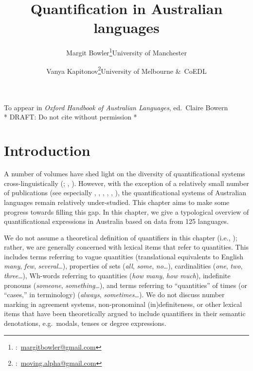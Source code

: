 \documentclass[12pt,egregdoesnotlikesansseriftitles]{scrartcl}
\title{Quantification in Australian languages}
\author{Margit Bowler\thanks{\Letter:~\href{mailto:margitbowler@gmail.com}{margitbowler@gmail.com}}\authorcr University of Manchester \and \vspace{-.5cm}Vanya Kapitonov\thanks{\Letter:~\href{mailto:moving.alpha@gmail.com}{moving.alpha@gmail.com}}\authorcr University of Melbourne \&\ CoEDL}
\begin{document}
\maketitle

\begin{center}
To appear in \textit{Oxford Handbook of Australian Languages}, ed.\ Claire Bowern\\
* DRAFT: Do not cite without permission *
\end{center}

\section{Introduction}

A number of volumes have shed light on the diversity of quantificational systems cross-linguistically (\citealt{keenanpaperno17,keenanpaperno12};  \citealt{qclp08}, \citealt{bachetal95}). However, with the exception of a relatively small number of publications (see especially \citealt{bowler17}, \citealt{bowernzentz12}, \citealt{alpher01},  \citealt{bittnerhale95}, \citealt{evans95}, \citealt{laughren81}), the quantificational systems of Australian languages remain relatively under-studied. This chapter aims to make some progress towards filling this gap. In this chapter, we give a typological overview of quantificational expressions in Australia based on data from 125 languages.

We do not assume a theoretical definition of quantifiers in this chapter (i.e., \citealt{heimkratzer98}); rather, we are generally concerned with lexical items that refer to quantities. This includes terms referring to vague quantities (translational equivalents to English \textit{many}, \textit{few}, \textit{several}\ldots), properties of sets (\textit{all}, \textit{some}, \textit{no}\ldots), cardinalities (\textit{one}, \textit{two}, \textit{three}\ldots), Wh-words referring to quantities (\textit{how many}, \textit{how much}), indefinite pronouns (\textit{someone}, \textit{something}\ldots), and terms referring to ``quantities'' of times (or ``cases,'' in  terminology) (\textit{always}, \textit{sometimes}\ldots). We do not discuss number marking in agreement systems, non-pronominal (in)definiteness, or other lexical items that have been theoretically argued to include quantifiers in their semantic denotations, e.g.\ modals, tenses or degree expressions.
\end{document}
